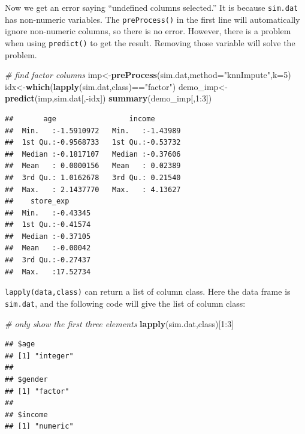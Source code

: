 \documentclass[12pt,]{krantz}
\newenvironment{Shaded}{\begin{snugshade}}{\end{snugshade}}
\newcommand{\KeywordTok}[1]{\textcolor[rgb]{0.13,0.29,0.53}{\textbf{{#1}}}}
\newcommand{\DataTypeTok}[1]{\textcolor[rgb]{0.13,0.29,0.53}{{#1}}}
\newcommand{\DecValTok}[1]{\textcolor[rgb]{0.00,0.00,0.81}{{#1}}}
\newcommand{\StringTok}[1]{\textcolor[rgb]{0.31,0.60,0.02}{{#1}}}
\newcommand{\CommentTok}[1]{\textcolor[rgb]{0.56,0.35,0.01}{\textit{{#1}}}}
\newcommand{\NormalTok}[1]{{#1}}
\theoremstyle{definition}
\theoremstyle{definition}
\theoremstyle{remark}
\begin{document}
Now we get an error saying ``undefined columns selected.'' It is because
\texttt{sim.dat} has non-numeric variables. The \texttt{preProcess()} in
the first line will automatically ignore non-numeric columns, so there
is no error. However, there is a problem when using \texttt{predict()}
to get the result. Removing those variable will solve the problem.

\begin{Shaded}
\begin{Highlighting}[]
\CommentTok{# find factor columns}
\NormalTok{imp<-}\KeywordTok{preProcess}\NormalTok{(sim.dat,}\DataTypeTok{method=}\StringTok{"knnImpute"}\NormalTok{,}\DataTypeTok{k=}\DecValTok{5}\NormalTok{)}
\NormalTok{idx<-}\KeywordTok{which}\NormalTok{(}\KeywordTok{lapply}\NormalTok{(sim.dat,class)==}\StringTok{"factor"}\NormalTok{)}
\NormalTok{demo_imp<-}\KeywordTok{predict}\NormalTok{(imp,sim.dat[,-idx])}
\KeywordTok{summary}\NormalTok{(demo_imp[,}\DecValTok{1}\NormalTok{:}\DecValTok{3}\NormalTok{])}
\end{Highlighting}
\end{Shaded}

\begin{verbatim}
##       age                 income        
##  Min.   :-1.5910972   Min.   :-1.43989  
##  1st Qu.:-0.9568733   1st Qu.:-0.53732  
##  Median :-0.1817107   Median :-0.37606  
##  Mean   : 0.0000156   Mean   : 0.02389  
##  3rd Qu.: 1.0162678   3rd Qu.: 0.21540  
##  Max.   : 2.1437770   Max.   : 4.13627  
##    store_exp       
##  Min.   :-0.43345  
##  1st Qu.:-0.41574  
##  Median :-0.37105  
##  Mean   :-0.00042  
##  3rd Qu.:-0.27437  
##  Max.   :17.52734
\end{verbatim}

\texttt{lapply(data,class)} can return a list of column class. Here the
data frame is \texttt{sim.dat}, and the following code will give the
list of column class:

\begin{Shaded}
\begin{Highlighting}[]
\CommentTok{# only show the first three elements}
\KeywordTok{lapply}\NormalTok{(sim.dat,class)[}\DecValTok{1}\NormalTok{:}\DecValTok{3}\NormalTok{]}
\end{Highlighting}
\end{Shaded}

\begin{verbatim}
## $age
## [1] "integer"
## 
## $gender
## [1] "factor"
## 
## $income
## [1] "numeric"
\end{verbatim}
\end{document}
